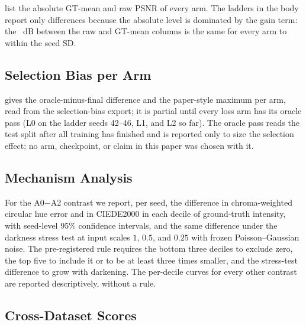  list the absolute GT-mean and raw PSNR of every arm. The
ladders in the body report only differences because the absolute level is dominated by the
gain term: the ~dB between the raw and GT-mean columns is the same for every arm
to within the seed SD.




\subsection{Selection Bias per Arm}
\label{sec:app-selection}

 gives the oracle-minus-final difference and the paper-style maximum per
arm, read from the selection-bias export; it is partial until every loss arm has its oracle
pass (L0 on the ladder seeds 42--46, L1, and L2 so far). The oracle pass reads the test split after all training has finished and is reported
only to size the selection effect; no arm, checkpoint, or claim in this paper was chosen
with it.



\subsection{Mechanism Analysis}
\label{sec:app-mechanism}

For the A0$-$A2 contrast we report, per seed, the difference in chroma-weighted circular hue
error and in CIEDE2000 in each decile of ground-truth intensity, with seed-level 95\%
confidence intervals, and the same difference under the darkness stress test at input
scales $1$, $0.5$, and $0.25$ with frozen Poisson--Gaussian noise. The pre-registered rule
requires the bottom three deciles to exclude zero, the top five to include it or to be at
least three times smaller, and the stress-test difference to grow with darkening. The
per-decile curves for every other contrast are reported descriptively, without a rule.

\subsection{Cross-Dataset Scores}
\label{sec:app-cross}

